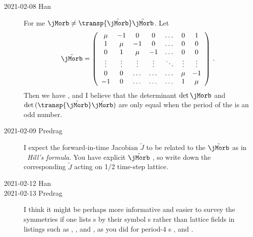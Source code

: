 \begin{description}
    \item[2021-02-08 Han] For me
$\jMorb\neq\transp{\tilde{\jMorb}}\tilde{\jMorb}$. Let
\[
\tilde{\jMorb}
  =
\left(\begin{array}{ccccccc}
 \mu& -1 & 0 & 0 &\dots &0& 1 \\
 1 &  \mu& -1 & 0 &\dots &0&0 \\
0 & 1 &  \mu & -1 &\dots &0 & 0 \\
\vdots & \vdots &\vdots & \vdots & \ddots &\vdots &\vdots\\
0 & 0 & \dots &\dots &\dots  & \mu& -1 \\
 -1 & 0 & \dots &  \dots &\dots& 1 &  \mu
        \end{array} \right)
\,.
\]
Then we have , and I believe that
the determinant $\det{\jMorb}$ and $\det{(\transp{\tilde{\jMorb}}
\tilde{\jMorb})}$ are only equal when the period of the {\lattstate} is
an odd number.


    \item[2021-02-09 Predrag]
I expect the forward-in-time Jacobian $\tilde{J}$ to be related to the
{\jacobianOrb} $\tilde{\jMorb}$ as in ~{\em
\catLatt\ Hill's formula}. You have explicit {\jacobianOrb}
$\tilde{\jMorb}$ , so write down the corresponding
$\tilde{J}$ acting on 1/2 time-step lattice.

    \item[2021-02-12 Han]

    \item[2021-02-13 Predrag]
I think it might be perhaps more informative and easier to
survey the symmetries if one lists {\lattstate}s by their symbol \brick s
rather than lattice fields in listings such as
, ,
 and , as you did for
period-4  {\lattstate}s
,
 and
.


\end{description}
